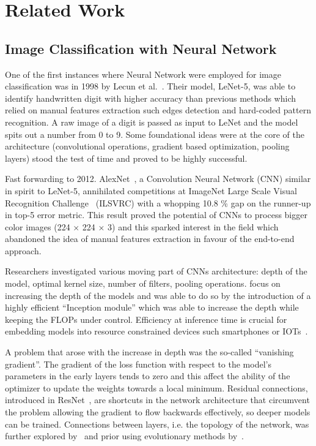 \chapter{Related Work}
\label{ch:related-work}

\section{Image Classification with Neural Network}
\label{sec:image-classification-with-neural-network}

One of the first instances where Neural Network were employed for image
classification was in 1998 by Lecun et al.~\cite{GradientBasedLecun1998}. Their
model, LeNet-5, was able to identify handwritten digit with higher accuracy
than previous methods which relied on manual features extraction such edges
detection and hard-coded pattern recognition. A raw image of a digit is passed
as input to LeNet and the model spits out a number from 0 to 9. Some
foundational ideas were at the core of the architecture (convolutional
operations, gradient based optimization, pooling layers) stood the test of time
and proved to be highly successful.

Fast forwarding to 2012. AlexNet~\cite{ImagenetClassiKrizhe2017}, a Convolution
Neural Network (CNN) similar in spirit to LeNet-5, annihilated competitions at
ImageNet Large Scale Visual Recognition Challenge~\cite{ImagenetALarDeng2009}
(ILSVRC) with a whopping 10.8 \% gap on the runner-up in top-5 error metric.
This result proved the potential of CNNs to process bigger color images (224 ×
224 × 3) and this sparked interest in the field which abandoned the idea of
manual features extraction in favour of the end-to-end approach.

Researchers investigated various moving part of CNNs architecture: depth of the
model, optimal kernel size, number of filters, pooling operations.
\cite{VeryDeepConvoSimony2014,GoingDeeperWiSzeged2014} focus on increasing the
depth of the models and \cite{GoingDeeperWiSzeged2014} was able to do so by the
introduction of a highly efficient ``Inception module'' which was able to increase
the depth while keeping the FLOPs under control. Efficiency at inference time is
crucial for embedding models into resource constrained devices such smartphones or
IOTs~\cite{SqueezenetAleIandol2016, MnasnetPlatfoTanM2018,
MobilenetsEffHoward2017}.

A problem that arose with the increase in depth was the so-called ``vanishing
gradient''. The gradient of the loss function with respect to the model's
parameters in the early layers tends to zero and this affect the ability of the
optimizer to update the weights towards a local minimum. Residual connections,
introduced in ResNet~\cite{DeepResidualLHeKa2015, IdentityMappinHeKa2016}, are
shortcuts in the network architecture that circumvent the problem allowing the
gradient to flow backwards effectively, so deeper models can be trained.
Connections between layers, i.e. the topology of the network, was further
explored by~\cite{DualPathNetwoChen2017, DenselyConnectHuang2016} and prior
using evolutionary methods by~\cite{DesigningNeuraMiller1989,
EvolvingNeuralStanle2002}.

